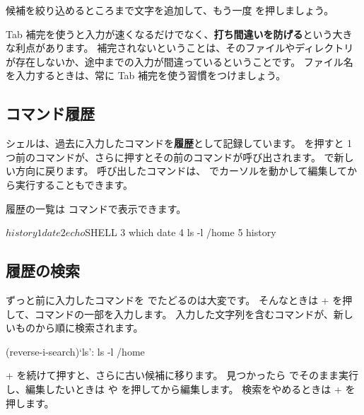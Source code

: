 
候補を絞り込めるところまで文字を追加して、もう一度  を押しましょう。

Tab 補完を使うと入力が速くなるだけでなく、\textbf{打ち間違いを防げる}という大きな利点があります。
補完されないということは、そのファイルやディレクトリが存在しないか、途中までの入力が間違っているということです。
ファイル名を入力するときは、常に Tab 補完を使う習慣をつけましょう。

\subsection{コマンド履歴}

シェルは、過去に入力したコマンドを\textbf{履歴}として記録しています。
\key{\(\uparrow\)} を押すと 1 つ前のコマンドが、さらに押すとその前のコマンドが呼び出されます。
\key{\(\downarrow\)} で新しい方向に戻ります。
呼び出したコマンドは、\key{\(\leftarrow\)} \key{\(\rightarrow\)} でカーソルを動かして編集してから実行することもできます。

履歴の一覧は  コマンドで表示できます。

\begin{terminal}[コマンド履歴を表示する]
$ history
    1  date
    2  echo $SHELL
    3  which date
    4  ls -l /home
    5  history
\end{terminal}

\subsection{履歴の検索}

ずっと前に入力したコマンドを \key{\(\uparrow\)} でたどるのは大変です。
そんなときは + を押して、コマンドの一部を入力します。
入力した文字列を含むコマンドが、新しいものから順に検索されます。

\begin{terminal}
(reverse-i-search)`ls': ls -l /home
\end{terminal}

+ を続けて押すと、さらに古い候補に移ります。
見つかったら  でそのまま実行し、編集したいときは \key{\(\leftarrow\)} や \key{\(\rightarrow\)} を押してから編集します。
検索をやめるときは + を押します。

